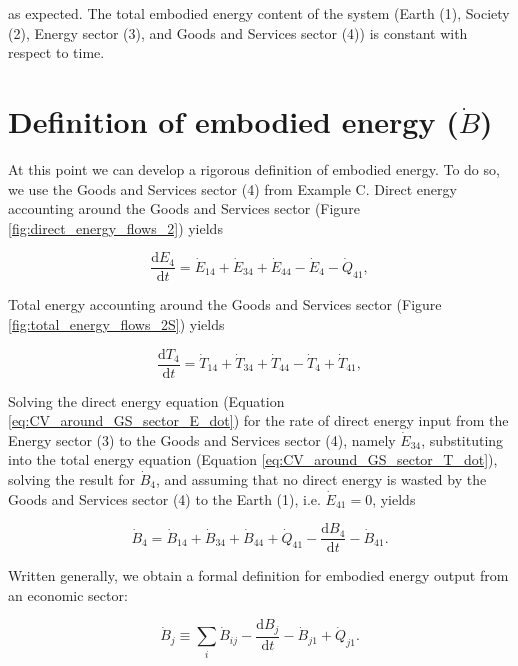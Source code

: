 \noindent as expected. The total embodied energy content of the system (Earth (1), Society (2), Energy sector (3), and Goods and Services sector (4)) is constant with respect to time.


\section{Definition of embodied energy ($\dot{B}$)}\label{sec:embodied_energy}

At this point we can develop a rigorous definition of embodied energy. To do so, we use the Goods and Services sector (4) from Example C. Direct energy accounting around the Goods and Services sector (Figure \ref{fig:direct_energy_flows_2}) yields

\begin{equation} \label{eq:CV_around_GS_sector_E_dot}
	\frac{\mathrm{d}E_{4}}{\mathrm{d}t} = \dot{E}_{14} + \dot{E}_{34} + \dot{E}_{44} - \dot{E}_{4} - \dot{Q}_{41},
\end{equation}

Total energy accounting around the Goods and Services sector (Figure \ref{fig:total_energy_flows_2S}) yields

\begin{equation} \label{eq:CV_around_GS_sector_T_dot}
	\frac{\mathrm{d}T_{4}}{\mathrm{d}t} = \dot{T}_{14} + \dot{T}_{34} + \dot{T}_{44} - \dot{T}_{4} + \dot{T}_{41},
\end{equation}

Solving the direct energy equation (Equation \ref{eq:CV_around_GS_sector_E_dot}) for the rate of direct energy input from the Energy sector (3) to the Goods and Services sector (4), namely $\dot{E}_{34}$, substituting into the total energy equation (Equation \ref{eq:CV_around_GS_sector_T_dot}), solving the result for $\dot{B}_{4}$, and assuming that no direct energy is wasted by the Goods and Services sector (4) to the Earth (1), i.e. $\dot{E}_{41} = 0$, yields

\begin{equation} \label{eq:embodied_output_GS}
	\dot{B}_{4} = \dot{B}_{14} + \dot{B}_{34} + \dot{B}_{44} + \dot{Q}_{41} - \frac{\mathrm{d}B_{4}}{\mathrm{d}t} - \dot{B}_{41}.
\end{equation}

Written generally, we obtain a formal definition for embodied energy output from an economic sector:

\begin{equation} \label{eq:embodied_def_1}
	\dot{B}_{j} \equiv \displaystyle\sum_{i} \dot{B}_{ij} - \frac{\mathrm{d}B_{j}}{\mathrm{d}t} - \dot{B}_{j1} + \dot{Q}_{j1}.
\end{equation}

